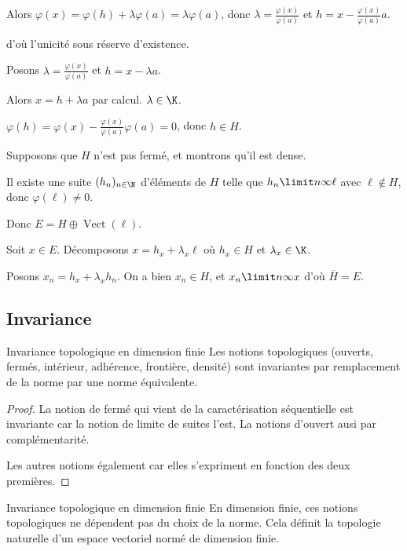 \begin{exemple}
    Alors $\varphi(x) = \varphi(h) + \lambda \varphi(a) = \lambda \varphi(a)$, donc
    $\lambda = \frac{\varphi(x)}{\varphi(a)}$ et $h = x - \frac{\varphi(x)}{\varphi(a)} a$.

    d'où l'unicité sous réserve d'existence. 


    Posons $\lambda = \frac{\varphi(x)}{\varphi(a)}$ et $h = x - \lambda a$.

    Alors $x = h + \lambda a$ par calcul. $\lambda \in \K$. 

    $\varphi(h) = \varphi(x) - \frac{\varphi(x)}{\varphi(a)} \varphi(a) = 0$, donc $h \in H$.

    Supposons que $H$ n'est pas fermé, et montrons qu'il est dense.

    Il existe une suite $(h_n)_{n \in \N}$ d'éléments de $H$ telle que 
    $h_n \limit n \infty \ell$ avec $\ell \not \in H$, donc $\varphi(\ell) \neq 0$.

    Donc $E = H \oplus \operatorname{Vect}(\ell)$.

    Soit $x \in E$. Décomposons $x = h_x + \lambda_x \ell$ où $h_x \in H$ et $\lambda_x \in \K$.

    Posons $x_n = h_x + \lambda_x h_n$. On a bien $x_n \in H$, et $x_n \limit n \infty x$ 
    d'où $\overline H = E$.
\end{exemple}


\subsection{Invariance}

\begin{theoreme}{Invariance topologique en dimension finie}{}
    Les notions topologiques (ouverts, fermés, intérieur, adhérence, frontière, densité) sont invariantes
    par remplacement de la norme par une norme équivalente. 
\end{theoreme}

\begin{proof}
    La notion de fermé qui vient de la caractérisation séquentielle est invariante car la notion de 
    limite de suites l'est. 
    La notions d'ouvert ausi par complémentarité. 

    Les autres notions également car elles s'expriment en fonction des deux premières.
\end{proof}


\begin{corollaire}{Invariance topologique en dimension finie}{}
    En dimension finie, ces notions topologiques ne dépendent pas du choix de la norme. Cela définit la topologie naturelle d'un espace vectoriel normé de dimension finie.
\end{corollaire}


